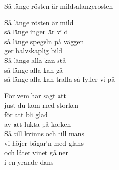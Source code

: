 \newpage

\begin{song}{Så länge rösten är mild}{salangerosten}
\begin{vers}
Så länge rösten är mild\\
så länge ingen är vild\\
så länge spegeln på väggen\\
ger halvskaplig bild\\
Så länge alla kan stå\\
så länge alla kan gå\\
så länge alla kan tralla så fyller vi på\\
\end{vers}
\begin{vers}
För vem har sagt att\\
just du kom med storken\\
för att bli glad\\
av att lukta på korken\\
Så till kvinns och till mans\\
vi höjer bägar'n med glans\\
och låter vinet gå ner\\
i en yrande dans\\
\end{vers}
\end{song}


